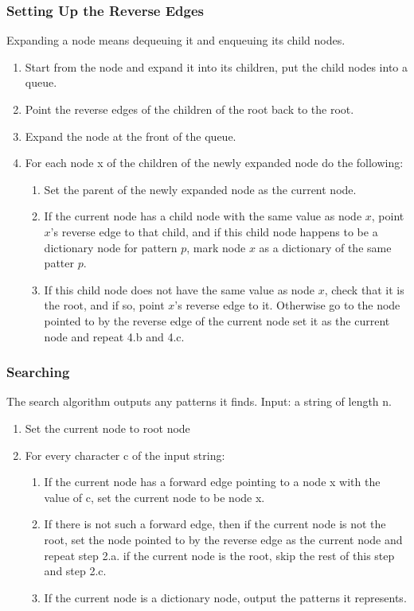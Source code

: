 \documentclass[paper=a4, fontsize=11pt]{scrartcl} %
\numberwithin{equation}{section} %
\numberwithin{figure}{section} %
\numberwithin{table}{section} %
\begin{document}
\subsubsection{Setting Up the Reverse Edges}
Expanding a node means dequeuing it and enqueuing its child nodes.
\begin{enumerate}
\item Start from the node and expand it into its children, put the child nodes into a queue.

\item Point the reverse edges of the children of the root back to the root.

\item Expand the node at the front of the queue.

\item For each node x of the children of the newly expanded node do the following:

\begin{enumerate}
    \item Set the parent of the newly expanded node as the current node.

    \item If the current node has a child node with the same value as node $x$, point $x$'s reverse edge to that child, and if this child node happens to be a dictionary node for pattern $p$, mark node $x$ as a dictionary of the same patter $p$.
    \item If this child node does not have the same value as node $x$, check that it is the root, and if so, point $x$'s reverse edge to it. Otherwise go to the node pointed to by the reverse edge of the current node set it as the current node and repeat 4.b and 4.c.
\end{enumerate}
\end{enumerate}

\subsubsection{Searching}
The search algorithm outputs any patterns it finds. Input: a string of length n.

\begin{enumerate}
  \item Set the current node to root node
  \item For every character c of the input string:
  \begin{enumerate}
    \item If the current node has a forward edge pointing to a node x with the value of c, set the current node to be node x.
    \item If there is not such a forward edge, then if the current node is not the root, set the node pointed to by the reverse edge as the current node and repeat step 2.a. if the current node is the root, skip the rest of this step and step 2.c.
    \item If the current node is a dictionary node, output the patterns it represents.
  \end{enumerate}
\end{enumerate}
\end{document}
